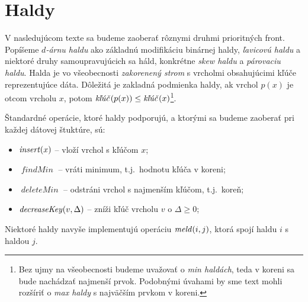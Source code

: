 \section{Haldy}

V nasledujúcom texte sa budeme zaoberať rôznymi druhmi prioritných front. Popíšeme \emph{$d$-árnu haldu} ako 
základnú modifikáciu binárnej haldy, \emph{ľavicovú haldu} a niektoré druhy samoupravujúcich sa háld, konkrétne 
\emph{skew haldu} a \emph{párovaciu haldu}.
Halda je vo všeobecnosti \emph{zakorenený strom} s vrcholmi obsahujúcimi kľúče reprezentujúce dáta. Dôležitá je 
zakladná podmienka haldy, ak vrchol $p(x)$ je otcom vrcholu $x$, potom
$\hbox{\emph{kľúč}}(p(x)) \leq \hbox{\emph{kľúč}}(x)$\footnote{Bez ujmy na všeobecnosti budeme uvažovať o \emph{min haldách},
teda v koreni sa bude nachádzať najmenší prvok. Podobnými úvahami by sme text mohli rozšíriť o \emph{max haldy}
s najväčším prvkom v koreni.}.

Štandardné operácie, ktoré haldy podporujú, a ktorými sa budeme zaoberať pri každej dátovej štuktúre, sú:
\begin{itemize}
\item $\mathop{\mathit{insert}}(x)$ -- vloží vrchol s kľúčom $x$;
\item $\mathop{\mathit{findMin}}$ -- vráti minimum, t.j.~hodnotu kľúča v koreni;
\item $\mathop{\mathit{deleteMin}}$ -- odstráni vrchol s najmenším kľúčom, t.j.~koreň;
\item $\mathop{\mathit{decreaseKey}}(v, \Delta)$ -- zníži kľúč vrcholu $v$ o $\Delta\geq0$;
\end{itemize}

Niektoré haldy navyše implementujú operáciu $\mathop{\mathit{meld}}(i, j)$, ktorá spojí haldu $i$ s haldou $j$.





